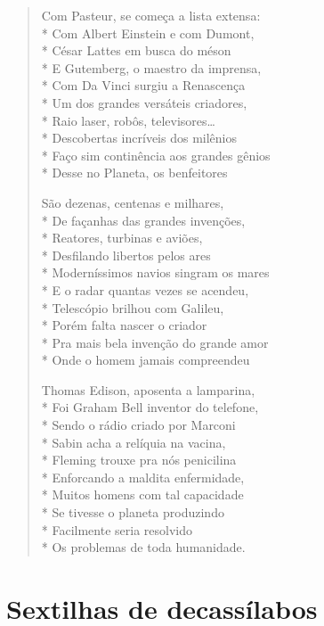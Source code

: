 \begin{verse}
Com Pasteur, se começa a lista extensa:\\*
Com Albert Einstein e com Dumont,\\*
César Lattes em busca do méson\\*
E Gutemberg, o maestro da imprensa,\\*
Com Da Vinci surgiu a Renascença\\*
Um dos grandes versáteis criadores,\\*
Raio laser, robôs, televisores\ldots{}\\*
Descobertas incríveis dos milênios\\*
Faço sim continência aos grandes gênios\\*
Desse no Planeta, os benfeitores

São dezenas, centenas e milhares,\\*
De façanhas das grandes invenções,\\*
Reatores, turbinas e aviões,\\*
Desfilando libertos pelos ares\\*
Moderníssimos navios singram os mares\\*
E o radar quantas vezes se acendeu,\\*
Telescópio brilhou com Galileu,\\*
Porém falta nascer o criador\\*
Pra mais bela invenção do grande amor\\*
Onde o homem jamais compreendeu

Thomas Edison, aposenta a lamparina,\\*
Foi Graham Bell inventor do telefone,\\*
Sendo o rádio criado por Marconi\\*
Sabin acha a relíquia na vacina,\\*
Fleming trouxe pra nós penicilina\\*
Enforcando a maldita enfermidade,\\*
Muitos homens com tal capacidade\\*
Se tivesse o planeta produzindo\\*
Facilmente seria resolvido\\*
Os problemas de toda humanidade.
\end{verse}


\cleardoublepage

\part*{Sextilhas de decassílabos}

